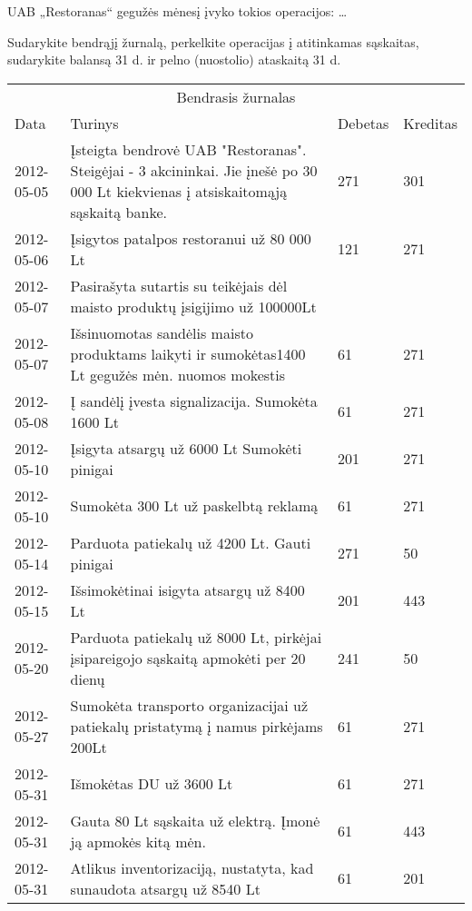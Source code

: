 \begin{tasks}

  \begin{task}
    \begin{condition}
      UAB „Restoranas“ gegužės mėnesį įvyko tokios operacijos: …

      Sudarykite bendrąjį žurnalą, perkelkite operacijas į
      atitinkamas sąskaitas, sudarykite balansą 31 d. ir pelno
      (nuostolio) ataskaitą 31 d.
    \end{condition}
    \begin{solution}
      \begin{tabularx}{\ltablewidth}[]{X | p{8cm} | X | X}
        \multicolumn{4}{c}{Bendrasis žurnalas} \\
        Data & Turinys & Debetas & Kreditas \\
        \hline
        2012-05-05 &
          Įsteigta bendrovė UAB "Restoranas". Steigėjai - 3
          akcininkai. Jie įnešė po 30 000 Lt kiekvienas į
          atsiskaitomąją sąskaitą banke.
          & 271 & 301 \\
        2012-05-06 &
          Įsigytos patalpos restoranui už 80 000 Lt
          & 121 & 271 \\
        2012-05-07 &
          Pasirašyta sutartis su teikėjais dėl maisto produktų
          įsigijimo už 100000Lt
          & & \\
        2012-05-07 &
          Išsinuomotas sandėlis maisto produktams laikyti ir
          sumokėtas1400 Lt gegužės mėn. nuomos mokestis
          & 61 & 271 \\
        2012-05-08 &
          Į sandėlį įvesta signalizacija. Sumokėta 1600 Lt
          & 61 & 271 \\
        2012-05-10 &
          Įsigyta atsargų už 6000 Lt Sumokėti pinigai
          & 201 & 271 \\
        2012-05-10 &
          Sumokėta 300 Lt už paskelbtą reklamą
          & 61 & 271 \\
        2012-05-14 &
          Parduota patiekalų už 4200 Lt. Gauti pinigai
          & 271 & 50 \\
        2012-05-15 &
          Išsimokėtinai isigyta atsargų už 8400 Lt
          & 201 & 443 \\
        2012-05-20 &
          Parduota patiekalų už 8000 Lt, pirkėjai įsipareigojo
          sąskaitą apmokėti per 20 dienų
          & 241 & 50 \\
        2012-05-27 &
          Sumokėta transporto organizacijai už patiekalų pristatymą
          į namus pirkėjams 200Lt
          & 61 & 271 \\
        2012-05-31 &
          Išmokėtas DU už 3600 Lt
          & 61 & 271 \\
        2012-05-31 &
          Gauta 80 Lt sąskaita už elektrą. Įmonė ją apmokės kitą mėn.
          & 61 & 443 \\
        2012-05-31 &
          Atlikus inventorizaciją, nustatyta, kad sunaudota atsargų
          už 8540 Lt
          & 61 & 201 \\
      \end{tabularx}


\end{solution}
\end{task}
\end{tasks}
